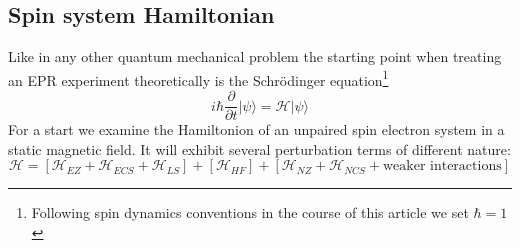 \documentclass[11.5pt,a4paper]{article}
\begin{document}
\subsection{Spin system Hamiltonian}
Like in any other quantum mechanical problem the starting point when treating an EPR experiment theoretically is the Schr\"odinger equation\footnote{Following spin dynamics conventions in the course of this article we set $\hbar = 1$}
\begin{equation}
 i \hbar \frac{\partial}{\partial t} |\psi\rangle = \mathcal{H} |\psi \rangle
\end{equation}
 For a start we examine the Hamiltonion of an unpaired spin electron system in a static magnetic field. It will exhibit several perturbation terms of different nature:
\begin{equation}
 \mathcal{H} = \left[\mathcal{H}_{EZ} + \mathcal{H}_{ECS} + \mathcal{H}_{LS}\right] + \left[\mathcal{H}_{HF}\right] + \left[\mathcal{H}_{NZ} + \mathcal{H}_{NCS} + \text{weaker interactions}\right]
\end{equation}
\end{document}

